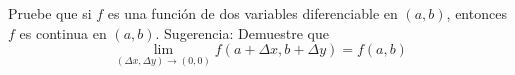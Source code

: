 \item Pruebe que si $f$ es una función de dos variables diferenciable en $(a, b)$, entonces $f$ es continua en $(a, b)$. Sugerencia: Demuestre que
\[ \lim_{(\Delta x, \Delta y) \to (0,0)} f(a + \Delta x, b + \Delta y) = f(a, b) \]
